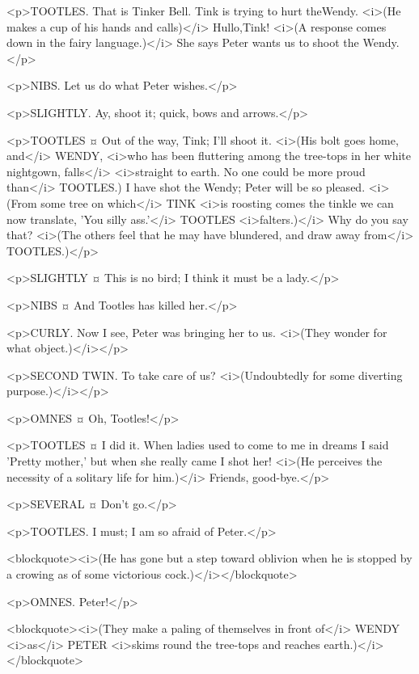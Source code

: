 <p>TOOTLES. That is Tinker Bell. Tink is trying to hurt theWendy. <i>(He makes a cup of his hands and calls)</i> Hullo,Tink! <i>(A response comes down in the fairy language.)</i> She says Peter wants us to shoot the Wendy.</p>

<p>NIBS. Let us do what Peter wishes.</p>

<p>SLIGHTLY. Ay, shoot it; quick, bows and arrows.</p>

<p>TOOTLES ¤
Out of the way, Tink; I'll shoot it. <i>(His bolt goes home, and</i> WENDY, <i>who has been fluttering among the tree-tops in her white nightgown, falls</i> <i>straight to earth. No one could be more proud than</i> TOOTLES.) I have shot the Wendy; Peter will be so pleased. <i>(From some tree on which</i> TINK <i>is roosting comes the tinkle we can now translate, 'You silly ass.'</i> TOOTLES <i>falters.)</i> Why do you say that? <i>(The others feel that he may have blundered, and draw away from</i> TOOTLES.)</p>

<p>SLIGHTLY ¤
This is no bird; I think it must be a lady.</p>

<p>NIBS ¤
And Tootles has killed her.</p>

<p>CURLY. Now I see, Peter was bringing her to us. <i>(They wonder for what object.)</i></p>

<p>SECOND TWIN. To take care of us? <i>(Undoubtedly for some diverting purpose.)</i></p>

<p>OMNES ¤
Oh, Tootles!</p>

<p>TOOTLES ¤
I did it. When ladies used to come to me in dreams I said 'Pretty mother,' but when she really came I shot her! <i>(He perceives the necessity of a solitary life for him.)</i> Friends, good-bye.</p>

<p>SEVERAL ¤
Don't go.</p>

<p>TOOTLES. I must; I am so afraid of Peter.</p>

<blockquote><i>(He has gone but a step toward oblivion when he is stopped by a crowing as of some victorious cock.)</i></blockquote>

<p>OMNES. Peter!</p>

<blockquote><i>(They make a paling of themselves in front of</i> WENDY <i>as</i> PETER <i>skims round the tree-tops and reaches earth.)</i></blockquote>

